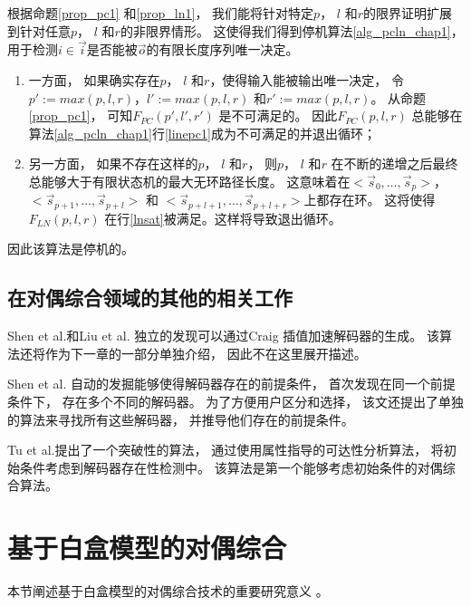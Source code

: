 %




根据命题\ref{prop_pc1} 和\ref{prop_ln1}，
我们能将针对特定$p$， $l$ 和$r$的限界证明扩展到针对任意$p$， $l$ 和$r$的非限界情形。
这使得我们得到停机算法\ref{alg_pcln_chap1}，
用于检测$i\in\vec{i}$是否能被$\vec{o}$的有限长度序列唯一决定。
\begin{enumerate}
 \item
一方面，
如果确实存在$p$， $l$ 和$r$，使得输入能被输出唯一决定，
令$p':=max(p,l,r)$，$l':=max(p,l,r)$ 和$r':=max(p,l,r)$。
从命题\ref{prop_pc1}，
可知$F_{PC}(p',l',r')$ 是不可满足的。
因此$F_{PC}(p,l,r)$ 总能够在算法\ref{alg_pcln_chap1}行\ref{linepc1}成为不可满足的并退出循环；
 \item
另一方面，
如果不存在这样的$p$， $l$ 和$r$，
则$p$， $l$ 和$r$ 在不断的递增之后最终总能够大于有限状态机的最大无环路径长度。
这意味着在$<\vec{s}_{0},\dots,\vec{s}_{p}>$，$<\vec{s}_{p+1},\dots,\vec{s}_{p+l}>$ 和
$<\vec{s}_{p+l+1},\dots,\vec{s}_{p+l+r}>$上都存在环。
这将使得$F_{LN}(p,l,r)$ 在行\ref{lnsat}被满足。这样将导致退出循环。
\end{enumerate}


因此该算法是停机的。



\subsection{在对偶综合领域的其他的相关工作}

Shen et al.和Liu et al. 独立的发现可以通过Craig 插值加速解码器的生成。
该算法还将作为下一章的一部分单独介绍，
因此不在这里展开描述。

Shen et al. 自动的发掘能够使得解码器存在的前提条件，
首次发现在同一个前提条件下，
存在多个不同的解码器。
为了方便用户区分和选择，
该文还提出了单独的算法来寻找所有这些解码器，
并推导他们存在的前提条件。

Tu et al.提出了一个突破性的算法，
通过使用属性指导的可达性分析算法，
将初始条件考虑到解码器存在性检测中。
该算法是第一个能够考虑初始条件的对偶综合算法。




\section{基于白盒模型的对偶综合}\label{sec_whiteboxtodo}
本节阐述基于白盒模型的对偶综合技术的重要研究意义
。



